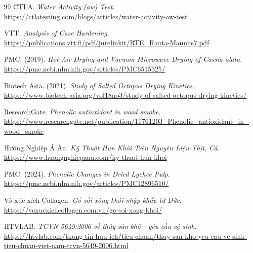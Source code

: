 \documentclass[12pt,a4paper]{report}
\begin{document}
\begin{thebibliography}{99}
 CTLA. \textit{Water Activity (aw) Test}. \url{https://ctlatesting.com/blogs/articles/water-activity-aw-test}

 VTT. \textit{Analysis of Case Hardening}. \url{https://publications.vtt.fi/pdf/jurelinkit/RTE_Ranta-Maunus7.pdf}

 PMC. (2019). \textit{Hot-Air Drying and Vacuum Microwave Drying of Cassia alata}. \url{https://pmc.ncbi.nlm.nih.gov/articles/PMC6515325/}

 Biotech Asia. (2021). \textit{Study of Salted Octopus Drying Kinetics}. \url{https://www.biotech-asia.org/vol18no3/study-of-salted-octopus-drying-kinetics/}

 ResearchGate. \textit{Phenolic antioxidant in wood smoke}. \url{https://www.researchgate.net/publication/11761203_Phenolic_antioxidant_in_wood_smoke}

 Hướng Nghiệp Á Âu. \textit{Kỹ Thuật Hun Khói Trên Nguyên Liệu Thịt, Cá}. \url{https://www.huongnghiepaau.com/ky-thuat-hun-khoi}

 PMC. (2024). \textit{Phenolic Changes in Dried Lychee Pulp}. \url{https://pmc.ncbi.nlm.nih.gov/articles/PMC12896510/}

 Vỏ xúc xích Collagen. \textit{Gỗ sồi xông khói nhập khẩu từ Đức}. \url{https://voxucxichcollagen.com.vn/go-soi-xong-khoi/}

 HTVLAB. \textit{TCVN 5649:2006 về thủy sản khô - yêu cầu vệ sinh}. \url{https://htvlab.com/thong-tin-huu-ich/tieu-chuan/thuy-san-kho-yeu-cau-ve-sinh-tieu-chuan-viet-nam-tcvn-5649-2006.html}

\end{thebibliography}
\end{document}
